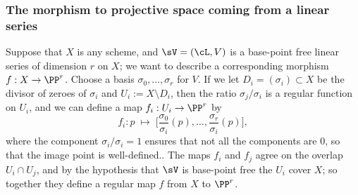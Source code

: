 %



\subsubsection{The morphism to projective space coming from a linear series} \label{morphism from series}

Suppose  that $X$ is any scheme, and $\sV = (\cL, V)$ is a base-point free linear series of dimension $r$ on $X$; we want to describe a corresponding morphism $f : X \to \PP^r$. Choose a basis $\sigma_0, \dots, \sigma_r$ for $V$. If we let $D_i = (\sigma_i) \subset X$ be the divisor of zeroes of $\sigma_i$ and $U_i := X \setminus D_i$, then the ratio $\sigma_j/\sigma_i$ is a regular function on $U_i$, and
we can define a map $f_i : U_i \to \PP^r$ by
$$
f_i : p \; \mapsto \; \big[\frac{\sigma_0}{\sigma_i}(p), \dots, \frac{\sigma_r}{\sigma_i}(p)\big], 
$$
where the component $\sigma_i/\sigma_i = 1$ ensures that not all the components are 0, so that the image point is well-defined..
The maps $f_i$ and $f_j$ agree on the overlap $U_i \cap U_j$, and by the hypothesis that $\sV$ is base-point free the $U_i$ cover $X$;
so together they define a regular map $f$ from $X$ to $\PP^r$. 

